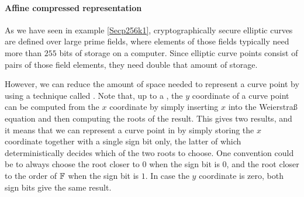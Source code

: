 \paragraph{Affine compressed representation} As we have seen in example \ref{Secp256k1}, cryptographically secure elliptic curves are defined over large prime fields, where elements of those fields typically need more than $255$ bits of storage on a computer. Since elliptic curve points consist of pairs of those field elements, they need double that amount of storage.

However, we can reduce the amount of space needed to represent a curve point by using a technique called . Note that, up to a , the $y$ coordinate of a curve point can be computed from the $x$ coordinate by simply inserting $x$ into the Weierstraß equation and then computing the roots of the result. This gives two results, and it means that we can represent a curve point in  by simply storing the $x$ coordinate together with a single sign bit only, the latter of which deterministically decides which of the two roots to choose. One convention could be to always choose the root closer to $0$ when the sign bit is $0$, and the root closer to the order of $\mathbb{F}$ when the sign bit is $1$. In case the $y$ coordinate is zero, both sign bits give the same result.



